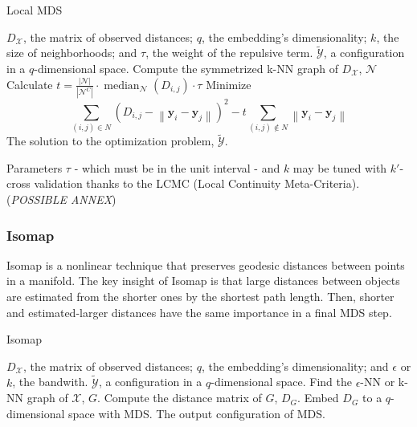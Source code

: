 \begin{algorithm}
    \caption{Local MDS}
    \label{alg:LocalMDS}
    
    \begin{algorithmic}[1]
    \REQUIRE $D_{\mathcal{X}}$, the matrix of observed distances; $q$, the embedding's dimensionality; $k$, the size of neighborhoods; and $\tau$, the weight of the repulsive term.
    \ENSURE $\tilde{\mathcal{Y}}$, a configuration in a $q$-dimensional space.
    \STATE Compute the symmetrized k-NN graph of $D_{\mathcal{X}}$, $\mathcal{N}$
    \STATE Calculate $t=\frac{|\mathcal{N}|}{\left|\mathcal{N}^C\right|} \cdot \operatorname{median}_{\mathcal{N}}\left(D_{i, j}\right) \cdot \tau$
    \STATE Minimize $$\sum_{(i, j) \in N}\left(D_{i, j}-\left\|\mathbf{y}_i-\mathbf{y}_j\right\|\right)^2 - t \sum_{(i, j) \notin N}\left\|\mathbf{y}_i-\mathbf{y}_j\right\|$$
    \RETURN The solution to the optimization problem, $\tilde{\mathcal{Y}}$.
    \end{algorithmic}
\end{algorithm}

Parameters $\tau$ - which must be in the unit interval - and $k$ may be tuned with $k'$-cross validation thanks to the LCMC (Local Continuity Meta-Criteria). (\textit{POSSIBLE ANNEX})

\subsubsection{Isomap}

Isomap \cite{Tenenbaum2000} is a nonlinear technique that preserves geodesic distances between points in a manifold. The key insight of Isomap is that large distances between objects are estimated from the shorter ones by the shortest path length. Then, shorter and estimated-larger distances have the same importance in a final MDS step.

\begin{algorithm}
    \caption{Isomap}
    \label{alg:Isomap}

    \begin{algorithmic}[1]
    \REQUIRE $D_{\mathcal{X}}$, the matrix of observed distances; $q$, the embedding's dimensionality; and $\epsilon$ or $k$, the bandwith.
    \ENSURE $\tilde{\mathcal{Y}}$, a configuration in a $q$-dimensional space.
    \STATE Find the $\epsilon$-NN or k-NN graph of $\mathcal{X}$, $G$.
    \STATE Compute the distance matrix of $G$, $D_G$.
    \STATE Embed $D_G$ to a $q$-dimensional space with MDS.
    \RETURN The output configuration of MDS.
    
    \end{algorithmic}
\end{algorithm}

